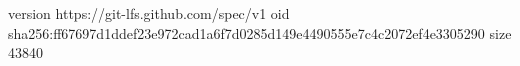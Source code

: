 version https://git-lfs.github.com/spec/v1
oid sha256:ff67697d1ddef23e972cad1a6f7d0285d149e4490555e7c4c2072ef4e3305290
size 43840
